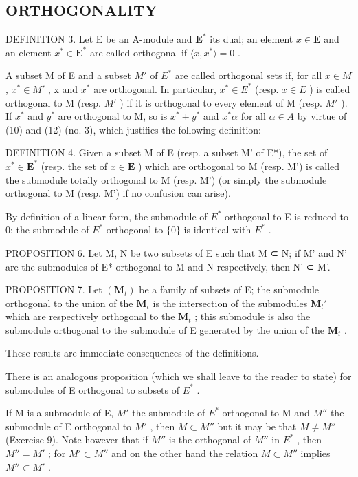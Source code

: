 \subsection{ORTHOGONALITY}

DEFINITION 3. Let E be an A-module and \(\mathbf{E}^*\) its dual; an element \(x \in \mathbf{E}\) and an element \(x^* \in \mathbf{E}^*\) are called orthogonal if \(\langle x, x^* \rangle = 0\) .

A subset M of E and a subset \(M'\) of \(E^{*}\) are called orthogonal sets if, for all \(x \in M\) , \(x^{*} \in M'\) , x and \(x^{*}\) are orthogonal. In particular, \(x^{*} \in E^{*}\) (resp. \(x \in E\) ) is called orthogonal to M (resp. \(M'\) ) if it is orthogonal to every element of M (resp. \(M'\) ). If \(x^{*}\) and \(y^{*}\) are orthogonal to M, so is \(x^{*} + y^{*}\) and \(x^{*}\alpha\) for all \(\alpha \in A\) by virtue of (10) and (12) (no. 3), which justifies the following definition:

DEFINITION 4. Given a subset M of E (resp. a subset M' of E*), the set of \(x^* \in \mathbf{E}^*\) (resp. the set of \(x \in \mathbf{E}\) ) which are orthogonal to M (resp. M') is called the submodule totally orthogonal to M (resp. M') (or simply the submodule orthogonal to M (resp. M') if no confusion can arise).

By definition of a linear form, the submodule of \(E^{*}\) orthogonal to E is reduced to 0; the submodule of \(E^{*}\) orthogonal to \(\{0\}\) is identical with \(E^{*}\) .

PROPOSITION 6. Let M, N be two subsets of E such that M ⊂ N; if M' and N' are the submodules of E* orthogonal to M and N respectively, then N' ⊂ M'.

PROPOSITION 7. Let \((\mathbf{M}_t)\) be a family of subsets of E; the submodule orthogonal to the union of the \(\mathbf{M}_t\) is the intersection of the submodules \(\mathbf{M}_t'\) which are respectively orthogonal to the \(\mathbf{M}_t\) ; this submodule is also the submodule orthogonal to the submodule of E generated by the union of the \(\mathbf{M}_t\) .

These results are immediate consequences of the definitions.

There is an analogous proposition (which we shall leave to the reader to state) for submodules of E orthogonal to subsets of \(E^{*}\) .

If M is a submodule of E, \(M'\) the submodule of \(E^{*}\) orthogonal to M and \(M''\) the submodule of E orthogonal to \(M'\) , then \(M \subset M''\) but it may be that \(M \neq M''\) (Exercise 9). Note however that if \(M''\) is the orthogonal of \(M''\) in \(E^{*}\) , then \(M'' = M'\) ; for \(M' \subset M''\) and on the other hand the relation \(M \subset M''\) implies \(M'' \subset M'\) .

